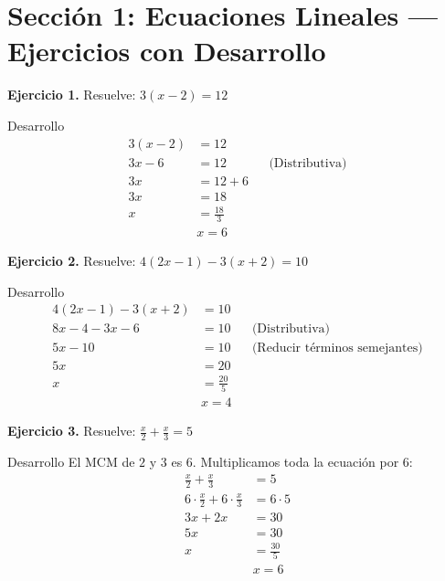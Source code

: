 \documentclass[letterpaper, 12pt]{article}
\begin{document}
\section*{Sección 1: Ecuaciones Lineales — Ejercicios con Desarrollo}

\textbf{Ejercicio 1.} Resuelve: $3(x - 2) = 12$

\begin{solucionbox}{Desarrollo}
\begin{align*}
    3(x - 2) &= 12 \\
    3x - 6 &= 12 && \text{(Distributiva)} \\
    3x &= 12 + 6 \\
    3x &= 18 \\
    x &= \frac{18}{3} \\[4pt]
    &\boxed{x = 6}
\end{align*}
\end{solucionbox}

\vspace{0.4cm}

\textbf{Ejercicio 2.} Resuelve: $4(2x - 1) - 3(x + 2) = 10$

\begin{solucionbox}{Desarrollo}
\begin{align*}
    4(2x - 1) - 3(x + 2) &= 10 \\
    8x - 4 - 3x - 6 &= 10 && \text{(Distributiva)} \\
    5x - 10 &= 10 && \text{(Reducir términos semejantes)} \\
    5x &= 20 \\
    x &= \frac{20}{5} \\[4pt]
    &\boxed{x = 4}
\end{align*}
\end{solucionbox}

\vspace{0.4cm}

\textbf{Ejercicio 3.} Resuelve: $\displaystyle\frac{x}{2} + \frac{x}{3} = 5$

\begin{solucionbox}{Desarrollo}
El MCM de $2$ y $3$ es $6$. Multiplicamos toda la ecuación por $6$:
\begin{align*}
    \frac{x}{2} + \frac{x}{3} &= 5 \\[6pt]
    6 \cdot \frac{x}{2} + 6 \cdot \frac{x}{3} &= 6 \cdot 5 \\[6pt]
    3x + 2x &= 30 \\
    5x &= 30 \\
    x &= \frac{30}{5} \\[4pt]
    &\boxed{x = 6}
\end{align*}
\end{solucionbox}
\end{document}
